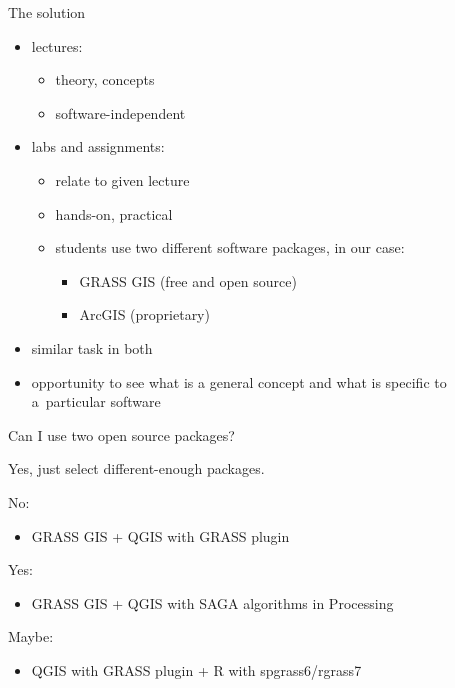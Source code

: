 \documentclass[xcolor={dvipsnames,usenames},beamer]{beamer}
\begin{document}
\begin{frame}{The solution}

\begin{itemize}
 \item lectures:
 \begin{itemize}
  \item theory, concepts
  \item software-independent
 \end{itemize}
 \item labs and assignments:
 \begin{itemize}
  \item relate to given lecture
  \item hands-on, practical
  \item \alert<1>{students use two different software packages}\pause, in our case:
  \begin{itemize}
   \item GRASS GIS (free and open source)
   \item ArcGIS (proprietary)
  \end{itemize}
 \end{itemize}
  \pause
  \item similar task in both
  \item opportunity to see what is a general concept
        and what is specific to a~particular software
\end{itemize}

\end{frame}


\begin{frame}{Can I use two open source packages?}

Yes, just select different-enough packages.

\bigskip

No:
\begin{itemize}
 \item GRASS GIS + QGIS with GRASS plugin %
\end{itemize}


Yes:
\begin{itemize}
 \item GRASS GIS + QGIS with SAGA algorithms in Processing
\end{itemize}

Maybe:
\begin{itemize}
 \item QGIS with GRASS plugin + R with spgrass6/rgrass7
\end{itemize}

\end{frame}
\end{document}
